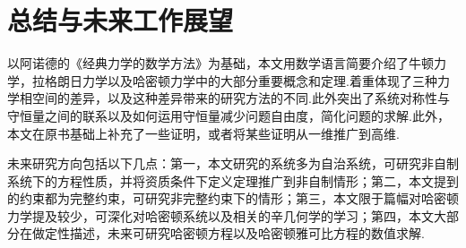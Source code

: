 \documentclass[UTF8,10.5pt,a4paper]{ctexart}
\numberwithin{equation}{section}
\theoremstyle{definition}
\theoremstyle{definition}
\begin{document}
\section{总结与未来工作展望}
以阿诺德的《经典力学的数学方法》为基础，本文用数学语言简要介绍了牛顿力学，拉格朗日力学以及哈密顿力学中的大部分重要概念和定理.着重体现了三种力学相空间的差异，以及这种差异带来的研究方法的不同.此外突出了系统对称性与守恒量之间的联系以及如何运用守恒量减少问题自由度，简化问题的求解.此外，本文在原书基础上补充了一些证明，或者将某些证明从一维推广到高维.
\par 未来研究方向包括以下几点：第一，本文研究的系统多为自治系统，可研究非自制系统下的方程性质，并将资质条件下定义定理推广到非自制情形；第二，本文提到的约束都为完整约束，可研究非完整约束下的情形；第三，本文限于篇幅对哈密顿力学提及较少，可深化对哈密顿系统以及相关的辛几何学的学习；第四，本文大部分在做定性描述，未来可研究哈密顿方程以及哈密顿雅可比方程的数值求解.
\newpage
\makeatletter
\renewenvironment{thebibliography}[1]
{\section*{\refname}%
\@mkboth{\MakeUppercase\refname}{\MakeUppercase\refname}%
\list{\@biblabel{\@arabic\c@enumiv}}%
{\settowidth\labelwidth{\@biblabel{#1}}%
\leftmargin\labelwidth
\advance\leftmargin\labelsep
\advance\leftmargin by 0em%
\itemindent 0em%
\@openbib@code
\usecounter{enumiv}%
\let\p@enumiv\@empty
\renewcommand\theenumiv{\@arabic\c@enumiv}}%
\sloppy
\clubpenalty4000
\@clubpenalty \clubpenalty
\widowpenalty4000%
\sfcode`\.\@m}
{\def\@noitemerr
{\@latex@warning{Empty `thebibliography' environment}}%
\endlist}
\makeatother
\end{document}
